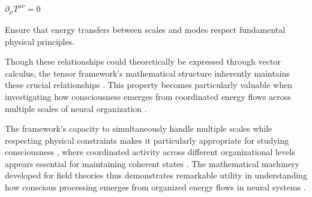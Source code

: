 $\partial_\mu T^{\mu\nu} = 0$

Ensure that energy transfers between scales and modes respect fundamental physical principles.

Though these relationships could theoretically be expressed through vector calculus, the tensor framework's mathematical structure inherently maintains these crucial relationships \cite{rosen2012anticipatory, varela2016embodied}. This property becomes particularly valuable when investigating how consciousness emerges from coordinated energy flows across multiple scales of neural organization \cite{koch2019feeling}.

The framework's capacity to simultaneously handle multiple scales while respecting physical constraints makes it particularly appropriate for studying consciousness \cite{thompson2014waking}, where coordinated activity across different organizational levels appears essential for maintaining coherent states \cite{feinberg2016ancient}. The mathematical machinery developed for field theories thus demonstrates remarkable utility in understanding how conscious processing emerges from organized energy flows in neural systems \cite{deacon2011incomplete, rovelli2018order}.